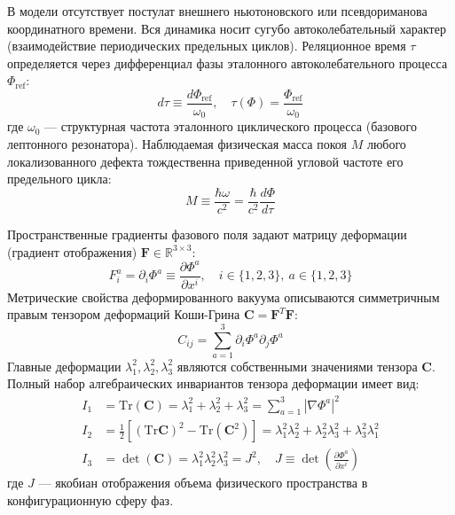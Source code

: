 \documentclass[12pt,a4paper]{article}
\begin{document}
	В модели отсутствует постулат внешнего ньютоновского или псевдориманова координатного времени. Вся динамика носит сугубо автоколебательный характер (взаимодействие периодических предельных циклов). Реляционное время $\tau$ определяется через дифференциал фазы эталонного автоколебательного процесса $\Phi_{\text{ref}}$:
	\begin{equation}
		d\tau \equiv \frac{d\Phi_{\text{ref}}}{\omega_0}, \quad \tau(\Phi) = \frac{\Phi_{\text{ref}}}{\omega_0}
	\end{equation}
	где $\omega_0$ — структурная частота эталонного циклического процесса (базового лептонного резонатора). Наблюдаемая физическая масса покоя $M$ любого локализованного дефекта тождественна приведенной угловой частоте его предельного цикла:
	\begin{equation}
		M \equiv \frac{\hbar \omega}{c^2} = \frac{\hbar}{c^2} \frac{d\Phi}{d\tau}
	\end{equation}
	
	Пространственные градиенты фазового поля задают матрицу деформации (градиент отображения) $\mathbf{F} \in \mathbb{R}^{3 \times 3}$:
	\begin{equation}
		F_i^a = \partial_i \Phi^a \equiv \frac{\partial \Phi^a}{\partial x^i}, \quad i \in \{1,2,3\}, \ a \in \{1,2,3\}
	\end{equation}
	Метрические свойства деформированного вакуума описываются симметричным правым тензором деформаций Коши-Грина $\mathbf{C} = \mathbf{F}^T \mathbf{F}$:
	\begin{equation}
		C_{ij} = \sum_{a=1}^3 \partial_i \Phi^a \partial_j \Phi^a
	\end{equation}
	Главные деформации $\lambda_1^2, \lambda_2^2, \lambda_3^2$ являются собственными значениями тензора $\mathbf{C}$. Полный набор алгебраических инвариантов тензора деформации имеет вид:
	\begin{align}
		I_1 &= \text{Tr}(\mathbf{C}) = \lambda_1^2 + \lambda_2^2 + \lambda_3^2 = \sum_{a=1}^3 |\nabla \Phi^a|^2 \\
		I_2 &= \frac{1}{2} \left[ (\text{Tr}\mathbf{C})^2 - \text{Tr}(\mathbf{C}^2) \right] = \lambda_1^2 \lambda_2^2 + \lambda_2^2 \lambda_3^2 + \lambda_3^2 \lambda_1^2 \\
		I_3 &= \det(\mathbf{C}) = \lambda_1^2 \lambda_2^2 \lambda_3^2 = J^2, \quad J \equiv \det\left(\frac{\partial \Phi^a}{\partial x^i}\right)
	\end{align}
	где $J$ — якобиан отображения объема физического пространства в конфигурационную сферу фаз.
	
\end{document}
